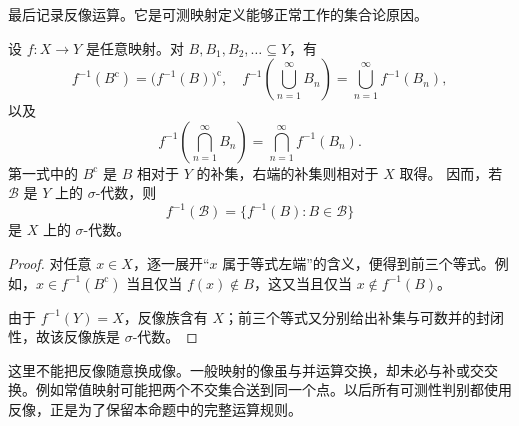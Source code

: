 \ProseParagraphBreak

最后记录反像运算。它是可测映射定义能够正常工作的集合论原因。

\begin{proposition}
\label{b1:prop:preimage-operations}
设 \(f:X\to Y\) 是任意映射。对 \(B,B_1,B_2,\ldots\subseteq Y\)，有
\[
f^{-1}(B^{\mathrm c})
=\bigl(f^{-1}(B)\bigr)^{\mathrm c},
\quad
f^{-1}\left(\bigcup_{n=1}^{\infty}B_n\right)
=\bigcup_{n=1}^{\infty}f^{-1}(B_n),
\]
以及
\[
f^{-1}\left(\bigcap_{n=1}^{\infty}B_n\right)
=\bigcap_{n=1}^{\infty}f^{-1}(B_n).
\]
第一式中的 \(B^{\mathrm c}\) 是 \(B\) 相对于 \(Y\) 的补集，右端的补集则相对于 \(X\) 取得。
因而，若 \(\mathcal B\) 是 \(Y\) 上的 \(\sigma\)-代数，则
\[
f^{-1}(\mathcal B)
=\{f^{-1}(B):B\in\mathcal B\}
\]
是 \(X\) 上的 \(\sigma\)-代数。
\end{proposition}
\begin{proof}
对任意 \(x\in X\)，逐一展开“\(x\) 属于等式左端”的含义，便得到前三个等式。例如，\(x\in f^{-1}(B^{\mathrm c})\) 当且仅当 \(f(x)\notin B\)，这又当且仅当 \(x\notin f^{-1}(B)\)。

由于 \(f^{-1}(Y)=X\)，反像族含有 \(X\)；前三个等式又分别给出补集与可数并的封闭性，故该反像族是 \(\sigma\)-代数。
\end{proof}

这里不能把反像随意换成像。一般映射的像虽与并运算交换，却未必与补或交交换。例如常值映射可能把两个不交集合送到同一个点。以后所有可测性判别都使用反像，正是为了保留本命题中的完整运算规则。
